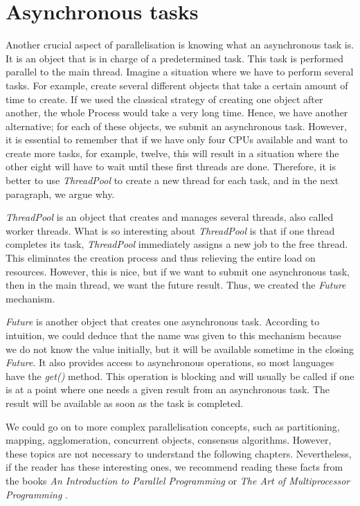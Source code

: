 \section{Asynchronous tasks}
\label{04:asynctaks}

Another crucial aspect of parallelisation is knowing what an asynchronous task is. It is an object that is in charge of a predetermined task. This task is performed parallel to the main thread. Imagine a situation where we have to perform several tasks. For example, create several different objects that take a certain amount of time to create. If we used the classical strategy of creating one object after another, the whole Process would take a very long time. Hence, we have another alternative; for each of these objects, we submit an asynchronous task. However, it is essential to remember that if we have only four CPUs available and want to create more tasks, for example, twelve, this will result in a situation where the other eight will have to wait until these first threads are done. Therefore, it is better to use \emph{ThreadPool} to create a new thread for each task, and in the next paragraph, we argue why.

\emph{ThreadPool} is an object that creates and manages several threads, also called worker threads. What is so interesting about \emph{ThreadPool} is that if one thread completes its task,
\emph{ThreadPool} immediately assigns a new job to the free thread.  This eliminates the creation process and thus relieving the entire load on resources. However, this is nice, but if we want to submit one asynchronous task, then in the main thread, we want the future result. Thus, we created the \emph{Future} mechanism.

\emph{Future} is another object that creates one asynchronous task. According to intuition, we could deduce that the name was given to this mechanism because we do not know the value initially, but it will be available sometime in the closing \emph{Future}. It also provides access to asynchronous operations, so most languages have the \emph{get()} method. This operation is blocking and will usually be called if one is at a point where one needs a given result from an asynchronous task. The result will be available as soon as the task is completed.

We could go on to more complex parallelisation concepts, such as partitioning, mapping, agglomeration, concurrent objects, consensus algorithms. However, these topics are not necessary to understand the following chapters. Nevertheless, if the reader has these interesting ones, we recommend reading these facts from the books \emph{An Introduction to Parallel Programming} \cite{introductionToParallelProgramming} or \emph{The Art of Multiprocessor Programming} \cite{artOfMultiprocessorProgramming}.
